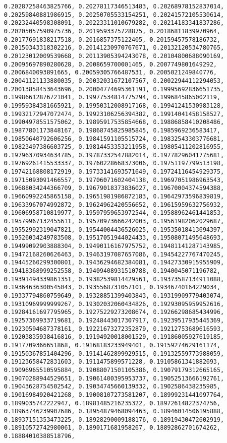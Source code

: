 \documentclass[11pt]{article}
\begin{document}
\begin{Verbatim}[commandchars=\\\{\}]
0.20287258463825766, 0.20278117346513483, 0.20268978152837014, 0.20259840881986915, 0.20250705533154251, 0.20241572105530614, 0.20232440598308091, 0.20223311010679282, 0.20214183341837286, 0.20205057590975736, 0.2019593375728875, 0.20186811839970964, 0.20177691838217518, 0.2016857375122405, 0.20159457578186732, 0.20150343318302216, 0.20141230970767671, 0.20132120534780765, 0.20123012009539668, 0.20113905394243078, 0.20104800688090169, 0.20095697890280628, 0.2008659700001465, 0.2007749801649292, 0.2006840093891665, 0.20059305766487531, 0.2005021249840776, 0.20041121133880035, 0.20032031672107567, 0.20022944112294053, 0.20013858453643696, 0.20004774695361191, 0.19995692836651735, 0.19986612876721041, 0.19977534814775294, 0.1996845865002119, 0.19959384381665921, 0.19950312008917168, 0.19941241530983128, 0.19932172947072474, 0.19923106256394382, 0.19914041458158527, 0.19904978551575062, 0.19895917535854668, 0.19886858410208486, 0.19877801173848167, 0.19868745825985845, 0.1985969236583417, 0.19850640792606256, 0.19841591105515724, 0.19832543303776681, 0.19823497386603725, 0.19814453353211958, 0.19805411202816955, 0.19796370934634785, 0.19787332547882014, 0.19778296041775681, 0.19769261415533337, 0.19760228668373006, 0.19751197799513198, 0.19742168808172919, 0.19733141693571649, 0.19724116454929375, 0.19715093091466557, 0.19706071602404138, 0.19697051986963543, 0.19688034244366709, 0.19679018373836027, 0.19670004374594388, 0.19660992245865158, 0.19651981986872183, 0.19642973596839819, 0.19633967074992872, 0.19624962420556652, 0.19615959632756932, 0.19606958710819977, 0.19597959653972544, 0.19588962461441853, 0.19579967132455611, 0.19570973666242003, 0.19561982062029687, 0.19552992319047821, 0.19544004436526025, 0.19535018413694397, 0.19526034249783508, 0.19517051944024433, 0.19508071495648693, 0.19499092903888304, 0.19490116167975752, 0.19481141287143985, 0.19472168260626463, 0.19463197087657086, 0.19454227767470245, 0.19445260299300801, 0.19436294682384081, 0.19427330915955909, 0.19418368999252558, 0.19409408931510788, 0.1940045071196782, 0.19391494339861351, 0.19382539814429561, 0.19373587134911088, 0.19364636300545043, 0.1935568731057101, 0.19346740164229034, 0.19337794860759649, 0.19328851399403843, 0.19319909779403074, 0.19310969999999267, 0.19302032060434826, 0.19293095959952616, 0.19284161697795965, 0.19275229273208674, 0.19266298685434996, 0.19257369933719681, 0.19248443017307917, 0.19239517935445369, 0.19230594687378161, 0.19221673272352879, 0.19212753689616593, 0.19203835938416816, 0.19194920018001529, 0.19186005927619185, 0.1917709366651868, 0.19168183233949401, 0.19159274629161174, 0.19150367851404296, 0.19141462899929515, 0.19132559773988059, 0.19123658472831603, 0.1911475899571228, 0.19105861341882693, 0.19096965510595884, 0.19088071501105386, 0.19079179312665165, 0.19070288944529651, 0.19061400395953737, 0.19052513666192761, 0.19043628754502542, 0.19034745660139332, 0.1902586438235985, 0.19016984920421268, 0.19008107273581207, 0.18999231441097764, 0.1899035742222947, 0.18981485216235322, 0.18972614822374756, 0.18963746239907686, 0.18954879468094463, 0.18946014506195888, 0.18937151353473225, 0.18928290009188176, 0.18919430472602919, 0.18910572742980061, 0.1890171681958267, 0.18892862701674262, 0.18884010388518796, 
\end{Verbatim}
\end{document}
